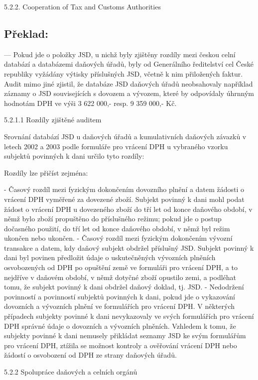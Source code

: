 \documentclass[10pt]{article}
\begin{document}
5.2.2. Cooperation of Tax and Customs Authorities



\pagebreak

\subsection*{Překlad:}

— Pokud jde o položky JSD, u nichž byly zjištěny rozdíly mezi českou celní databází a databázemi daňových úřadů, byly od Generálního ředitelství cel České republiky vyžádány výtisky příslušných JSD, včetně k nim přiložených faktur.
Audit mimo jiné zjistil, že databáze JSD daňových úřadů neobsahovaly například záznamy o JSD souvisejících s dovozem a vývozem, které by odpovídaly úhrnným hodnotám DPH ve výši 3 622 000,- resp. 9 359 000,- Kč.


5.2.1.1 Rozdíly zjištěné auditem



Srovnání databází JSD u daňových úřadů a kumulativních daňových závazků v letech 2002 a 2003 podle formuláře pro vrácení DPH u vybraného vzorku subjektů povinných k dani určilo tyto rozdíly:



Rozdíly lze přičíst zejména:

- Časový rozdíl mezi fyzickým dokončením dovozního plnění a datem žádosti o vrácení DPH vyměřené za dovezené zboží.
Subjekt povinný k dani mohl podat žádost o vrácení DPH u dovezeného zboží do tří let od konce daňového období, v němž bylo zboží propuštěno do příslušného režimu; pokud jde o postup dočasného použití, do tří let od konce daňového období, v němž byl režim ukončen nebo ukončen.
- Časový rozdíl mezi fyzickým dokončením vývozní transakce a datem, kdy daňový subjekt obdržel příslušný JSD.
Subjekt povinný k dani byl povinen předložit údaje o uskutečněných vývozních plněních osvobozených od DPH po opuštění země ve formuláři pro vrácení DPH, a to nejdříve v daňovém období, v němž dotyčné zboží opustilo zemi, a podléhat tomu, že subjekt povinný k dani obdržel daňový doklad, tj. JSD.
- Nedodržení povinností a povinností subjektů povinných k dani, pokud jde o vykazování dovozních a vývozních plnění ve formulářích pro vrácení DPH.
V některých případech subjekty povinné k dani nevykazovaly ve svých formulářích pro vrácení DPH správné údaje o dovozních a vývozních plněních.
Vzhledem k tomu, že subjekty povinné k dani nemusely přikládat seznamy JSD ke svým formulářům pro vrácení DPH, ztížila se možnost kontroly a ověřování vrácení DPH nebo žádostí o osvobození od DPH ze strany daňových úřadů.


5.2.2 Spolupráce daňových a celních orgánů
\end{document}
